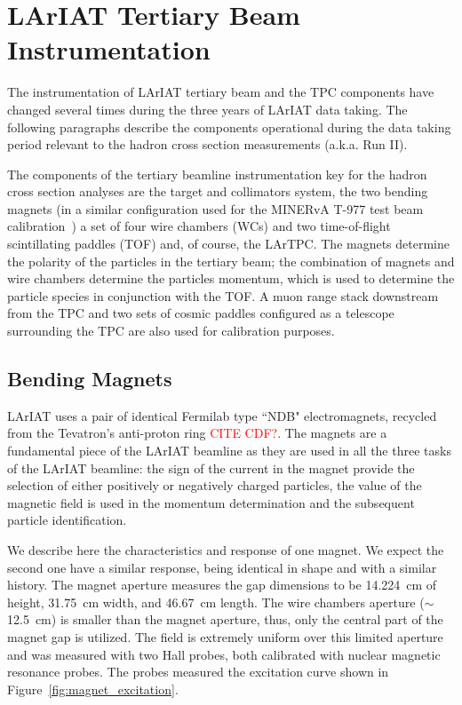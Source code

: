 \section{LArIAT Tertiary Beam Instrumentation}\label{sec:Instrumentation}

The instrumentation of  LArIAT tertiary beam and the TPC components have changed several times during the three years of LArIAT data taking. The following paragraphs describe the components operational during the data taking period relevant to the hadron cross section measurements (a.k.a. Run II).

The components of the tertiary beamline instrumentation key for the hadron cross section analyses are the target and collimators system, the two bending magnets (in a similar configuration used for the  MINERvA T-977 test beam calibration~\cite{MinervaTestbeam}) a set of four wire chambers (WCs) and two time-of-flight scintillating paddles (TOF) and, of course, the LArTPC.  The magnets determine the polarity of the particles in the tertiary beam; the combination of magnets and wire chambers determine the particles momentum, which is used to determine the particle species in conjunction with the TOF.
A muon range stack downstream from the TPC and two sets of cosmic paddles configured as a telescope surrounding the TPC are also used for calibration purposes.


\subsection{Bending Magnets}\label{sec:Magnets}
LArIAT uses a pair of identical Fermilab type ``NDB" electromagnets, recycled from the Tevatron's anti-proton ring \textcolor{red}{CITE CDF?}. 
The magnets are a fundamental piece of the LArIAT beamline as they are used in all the three tasks of the LArIAT beamline: the sign of the current in the magnet provide the selection of either positively or negatively charged particles, the value of the magnetic field is used in the momentum determination and the subsequent particle identification. 

We describe here the characteristics and response of one magnet. We expect the second one have a similar response, being identical in shape and with a similar history. The magnet aperture measures the gap dimensions to be 14.224~cm of height, 31.75~cm width, and  46.67~cm length.  The wire chambers aperture ($\sim$12.5~cm) is smaller than the magnet aperture, thus, only the central part of the magnet gap is utilized. The field is extremely uniform over this limited aperture and was measured with two Hall probes, both calibrated with nuclear magnetic resonance probes. The probes measured the excitation curve shown in Figure~\ref{fig:magnet_excitation}. 

